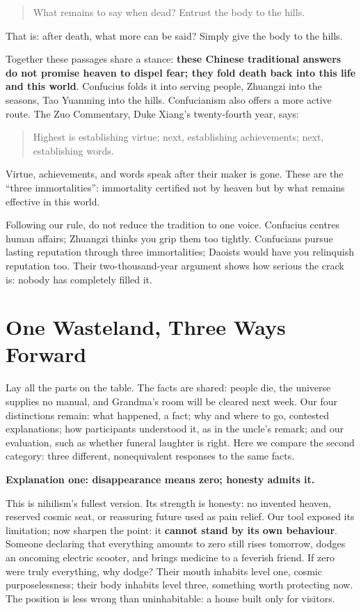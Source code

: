 \begin{quote}
What remains to say when dead? Entrust the body to the hills.
\end{quote}
That is: after death, what more can be said? Simply give the body to the hills.

Together these passages share a stance: \textbf{these Chinese traditional answers do not promise heaven to dispel fear; they fold death back into this life and this world}. Confucius folds it into serving people, Zhuangzi into the seasons, Tao Yuanming into the hills. Confucianism also offers a more active route. The Zuo Commentary, Duke Xiang's twenty-fourth year, says:

\begin{quote}
Highest is establishing virtue; next, establishing achievements; next, establishing words.
\end{quote}
Virtue, achievements, and words speak after their maker is gone. These are the ``three immortalities'': immortality certified not by heaven but by what remains effective in this world.

Following our rule, do not reduce the tradition to one voice. Confucius centres human affairs; Zhuangzi thinks you grip them too tightly. Confucians pursue lasting reputation through three immortalities; Daoists would have you relinquish reputation too. Their two-thousand-year argument shows how serious the crack is: nobody has completely filled it.

\section{One Wasteland, Three Ways Forward}
Lay all the parts on the table. The facts are shared: people die, the universe supplies no manual, and Grandma's room will be cleared next week. Our four distinctions remain: what happened, a fact; why and where to go, contested explanations; how participants understood it, as in the uncle's remark; and our evaluation, such as whether funeral laughter is right. Here we compare the second category: three different, nonequivalent responses to the same facts.

\textbf{Explanation one: disappearance means zero; honesty admits it.}

This is nihilism's fullest version. Its strength is honesty: no invented heaven, reserved cosmic seat, or reassuring future used as pain relief. Our tool exposed its limitation; now sharpen the point: it \textbf{cannot stand by its own behaviour}. Someone declaring that everything amounts to zero still rises tomorrow, dodges an oncoming electric scooter, and brings medicine to a feverish friend. If zero were truly everything, why dodge? Their mouth inhabits level one, cosmic purposelessness; their body inhabits level three, something worth protecting now. The position is less wrong than uninhabitable: a house built only for visitors.

